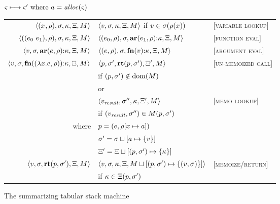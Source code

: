 \begin{figure}
  \centering
  $\varsigma \longmapsto \varsigma' \text{ where } a = \mathit{alloc}(\varsigma)$ \\
  \begin{tabular}{r|ll}
    \hline
    $\langle (x^{{}}, \rho), \sigma, \kappa, \Xi, M \rangle$
    &
    $\langle v,\sigma,\kappa, \Xi, M \rangle$ if $v \in \sigma(\rho(x))$
    &
    \textsc{[variable lookup]}
    \\
    $\langle ((e_{0}\ e_{1}){}, \rho), \sigma, \kappa, \Xi, M \rangle$
    &
    $\langle (e_{0}, \rho), \sigma, \mathbf{ar}{}(e_{1},\rho){\tt :} \kappa, \Xi, M \rangle$
    &
    \textsc{[function eval]}
    \\
    $\langle v, \sigma, \mathbf{ar}{}(e,\rho){\tt :} \kappa, \Xi, M \rangle$
    &
    $\langle (e, \rho), \sigma, \mathbf{fn}{}(v){\tt :} \kappa, \Xi, M \rangle$
    &
    \textsc{[argument eval]}
    \\
    $\langle v,\sigma,\mathbf{fn}{}((\lambda{} x. e, \rho)){\tt :} \kappa,\Xi,M \rangle$
    & %
    $\langle p,
          \sigma',
          \mathbf{rt}(p, \sigma'),
          \Xi',
          M \rangle$
    &
    \textsc{[un-memoized call]}
     \\ & \quad if $(p, \sigma') \notin \text{dom}(M)$
\\
    & or \\
    & $\langle v_\mathit{result},
            \sigma'',
            \kappa,
            \Xi',
            M \rangle$
    & \textsc{[memo lookup]}
    \\ & \quad if $(v_\mathit{result},\sigma'') \in M(p,\sigma')$
    \\ %
    where & $p = (e, \rho[x \mapsto a])$ \\
          & $\sigma' = \sigma\sqcup[a \mapsto \{ v \}]$ \\
          & $\Xi' = \Xi\sqcup[(p, \sigma') \mapsto \{ \kappa \}]$
    \\
    $\langle v, \sigma, \mathbf{rt}(p,\sigma'), \Xi, M \rangle$
    &
    $\langle v, \sigma, \kappa, \Xi, M\sqcup[(p, \sigma') \mapsto \{ (v,\sigma) \}] \rangle$
    &
    \textsc{[memoize/return]}
    \\ & \quad if $\kappa \in \Xi(p, \sigma')$
  \end{tabular}
  \caption{The summarizing tabular stack machine}
  \label{fig:summary-semantics}
\end{figure}

